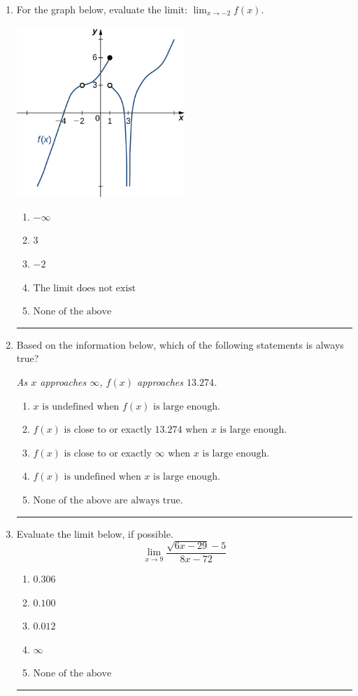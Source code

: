 \documentclass[14pt]{extbook}
\newcommand{\litem}[1]{\item#1\hspace*{-1cm}\rule{\textwidth}{0.4pt}}
\begin{document}
\begin{enumerate}
{\begin{enumerate}[label=\Alph*.]
\end{enumerate} }
\litem{
For the graph below, evaluate the limit: $ \displaystyle \lim_{x \rightarrow -2} f(x)$.
\begin{center}
    \includegraphics[width=0.5\textwidth]{../Figures/evaluateLimitGraphicallyCopyB.png}
\end{center}
\begin{enumerate}[label=\Alph*.]
\item \( -\infty \)
\item \( 3 \)
\item \( -2 \)
\item \( \text{The limit does not exist} \)
\item \( \text{None of the above} \)

\end{enumerate} }
\litem{
Based on the information below, which of the following statements is always true?
\begin{center}
    \textit{ As $x$ approaches $\infty$, $f(x)$ approaches $13.274$. }
\end{center}
\begin{enumerate}[label=\Alph*.]
\item \( x \text{ is undefined when } f(x) \text{ is large enough}. \)
\item \( f(x) \text{ is close to or exactly } 13.274 \text{ when } x \text{ is large enough}. \)
\item \( f(x) \text{ is close to or exactly } \infty \text{ when } x \text{ is large enough}. \)
\item \( f(x) \text{ is undefined when } x \text{ is large enough}. \)
\item \( \text{None of the above are always true.} \)

\end{enumerate} }
\litem{
Evaluate the limit below, if possible.\[ \lim_{x \rightarrow 9} \frac{\sqrt{6x - 29} - 5}{8x - 72} \]\begin{enumerate}[label=\Alph*.]
\item \( 0.306 \)
\item \( 0.100 \)
\item \( 0.012 \)
\item \( \infty \)
\item \( \text{None of the above} \)


\end{enumerate}}
\end{enumerate}
\end{document}
